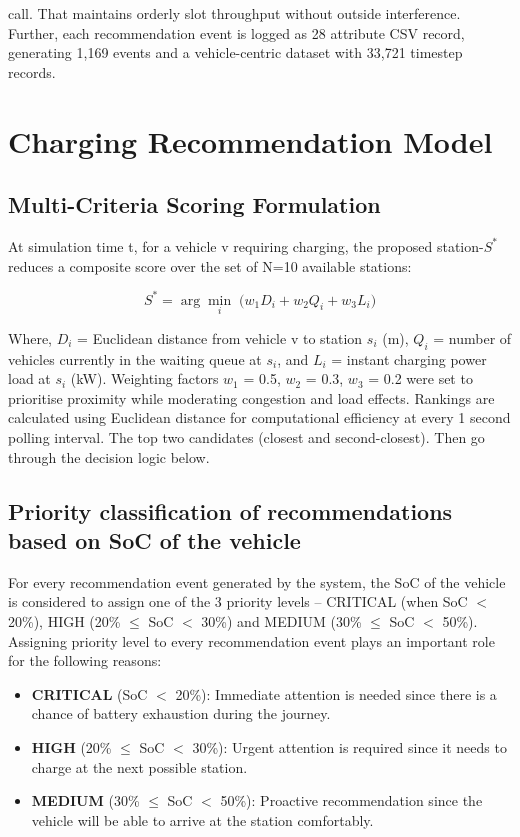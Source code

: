 \documentclass[conference]{IEEEtran}
\begin{document}
call. That maintains orderly slot throughput without outside
interference. Further, each recommendation event is logged as 28 attribute CSV record, generating 1,169 events and a vehicle-centric dataset with 33,721 timestep records.


\vspace{-3mm}
\section{Charging Recommendation Model}

\subsection{Multi-Criteria Scoring Formulation}

At simulation time t, for a vehicle v requiring charging, the proposed
station-$S^{*}$ reduces a composite score over the set of N=10
available stations:

\begin{equation}
  S^{*} = \arg\min_{i}\;\bigl(w_1 D_i + w_2 Q_i + w_3 L_i\bigr)
  \label{eq:score}
\end{equation}

Where, $D_i$ = Euclidean distance from vehicle v to station $s_i$ (m),
$Q_i$ = number of vehicles currently in the waiting queue at $s_i$, and
$L_i$ = instant charging power load at $s_i$ (kW). Weighting factors
$w_1$ = 0.5, $w_2$ = 0.3, $w_3$ = 0.2 were set to prioritise proximity
while moderating congestion and load effects. Rankings are calculated
using Euclidean distance for computational efficiency at every 1 second
polling interval. The top two candidates (closest and second-closest).
Then go through the decision logic below.

\subsection{Priority classification of recommendations based on SoC of the vehicle}

For every recommendation event generated by the system, the SoC of the vehicle is considered to assign one of the 3 priority levels – CRITICAL (when SoC $<$ 20\%), HIGH (20\% $\leq$ SoC $<$ 30\%) and MEDIUM (30\% $\leq$ SoC $<$ 50\%). Assigning priority level to every recommendation event plays an important role for the following reasons:
\begin{itemize}
  \item \textbf{CRITICAL} (SoC $<$ 20\%): Immediate attention is needed since there is a chance of battery exhaustion during the journey.
  \item \textbf{HIGH} (20\% $\leq$ SoC $<$ 30\%): Urgent attention is required since it needs to charge at the next possible station.
  \item \textbf{MEDIUM} (30\% $\leq$ SoC $<$ 50\%): Proactive recommendation since the vehicle will be able to arrive at the station comfortably.
\end{itemize}
\end{document}
